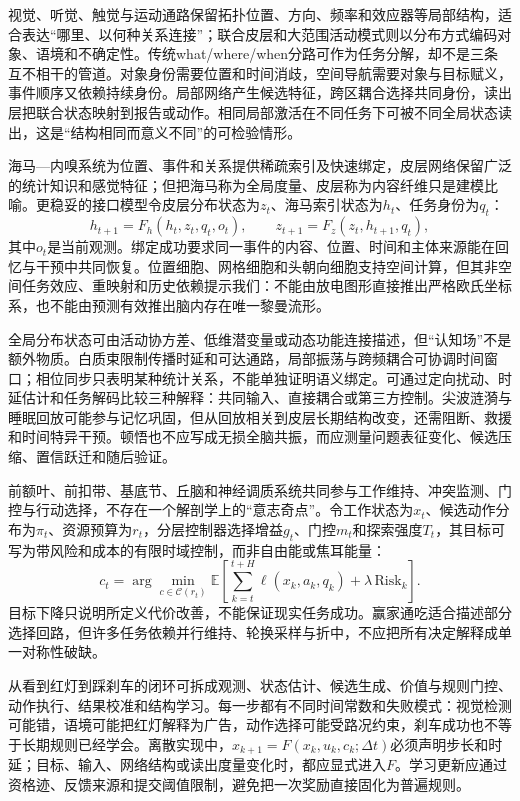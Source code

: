 \label{subsec:brain_micro_layer}
视觉、听觉、触觉与运动通路保留拓扑位置、方向、频率和效应器等局部结构，适合表达“哪里、以何种关系连接”；联合皮层和大范围活动模式则以分布方式编码对象、语境和不确定性。传统what/where/when分路可作为任务分解，却不是三条互不相干的管道。对象身份需要位置和时间消歧，空间导航需要对象与目标赋义，事件顺序又依赖持续身份。局部网络产生候选特征，跨区耦合选择共同身份，读出层把联合状态映射到报告或动作。相同局部激活在不同任务下可被不同全局状态读出，这是“结构相同而意义不同”的可检验情形。

\label{subsec:brain_manifold_coupling}
海马—内嗅系统为位置、事件和关系提供稀疏索引及快速绑定，皮层网络保留广泛的统计知识和感觉特征；但把海马称为全局度量、皮层称为内容纤维只是建模比喻。更稳妥的接口模型令皮层分布状态为$z_t$、海马索引状态为$h_t$、任务身份为$q_t$：
\begin{equation}
 h_{t+1}=F_h(h_t,z_t,q_t,o_t),\qquad z_{t+1}=F_z(z_t,h_{t+1},q_t),
\end{equation}
其中$o_t$是当前观测。绑定成功要求同一事件的内容、位置、时间和主体来源能在回忆与干预中共同恢复。位置细胞、网格细胞和头朝向细胞支持空间计算，但其非空间任务效应、重映射和历史依赖提示我们：不能由放电图形直接推出严格欧氏坐标系，也不能由预测有效推出脑内存在唯一黎曼流形。

\label{subsec:brain_cognitive_field}
全局分布状态可由活动协方差、低维潜变量或动态功能连接描述，但“认知场”不是额外物质。白质束限制传播时延和可达通路，局部振荡与跨频耦合可协调时间窗口；相位同步只表明某种统计关系，不能单独证明语义绑定。可通过定向扰动、时延估计和任务解码比较三种解释：共同输入、直接耦合或第三方控制。尖波涟漪与睡眠回放可能参与记忆巩固，但从回放相关到皮层长期结构改变，还需阻断、救援和时间特异干预。顿悟也不应写成无损全脑共振，而应测量问题表征变化、候选压缩、置信跃迁和随后验证。

\label{subsec:brain_macro_layer}
前额叶、前扣带、基底节、丘脑和神经调质系统共同参与工作维持、冲突监测、门控与行动选择，不存在一个解剖学上的“意志奇点”。令工作状态为$x_t$、候选动作分布为$\pi_t$、资源预算为$r_t$，分层控制器选择增益$g_t$、门控$m_t$和探索强度$T_t$，其目标可写为带风险和成本的有限时域控制，而非自由能或焦耳能量：
\begin{equation}
 c_t=\arg\min_{c\in\mathcal C(r_t)}\mathbb E\!\left[\sum_{k=t}^{t+H}\ell(x_k,a_k,q_k)+\lambda\,\mathrm{Risk}_k\right].
\end{equation}
目标下降只说明所定义代价改善，不能保证现实任务成功。赢家通吃适合描述部分选择回路，但许多任务依赖并行维持、轮换采样与折中，不应把所有决定解释成单一对称性破缺。

\label{subsec:brain_tdci_cycle}
从看到红灯到踩刹车的闭环可拆成观测、状态估计、候选生成、价值与规则门控、动作执行、结果校准和结构学习。每一步都有不同时间常数和失败模式：视觉检测可能错，语境可能把红灯解释为广告，动作选择可能受路况约束，刹车成功也不等于长期规则已经学会。离散实现中，$x_{k+1}=F(x_k,u_k,c_k;\Delta t)$必须声明步长和时延；目标、输入、网络结构或读出度量变化时，都应显式进入$F$。学习更新应通过资格迹、反馈来源和提交阈值限制，避免把一次奖励直接固化为普遍规则。

